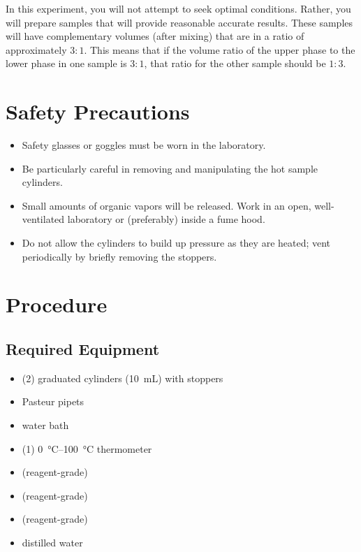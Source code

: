 In this experiment, you will not attempt to seek optimal conditions. 
Rather, you will prepare samples that will provide reasonable accurate results. 
These samples will have complementary volumes (after mixing) that are in a ratio of approximately \(3{:}1\). This means that if the volume ratio of the upper phase to the lower phase in one sample is \(3{:}1\), that ratio for the other sample should be \(1{:}3\).

\section{Safety Precautions}
\label{sec:safety}

\begin{itemize}
	\item Safety glasses or goggles must be worn in the laboratory.
	\item Be particularly careful in removing and manipulating the hot sample cylinders.
	\item Small amounts of organic vapors will be released. 
		Work in an open, well-ventilated laboratory or (preferably) inside a fume hood.
	\item Do not allow the cylinders to build up pressure as they are heated; vent periodically by briefly removing the stoppers.
\end{itemize}

\section{Procedure}
\label{sec:procedure}

\subsection{Required Equipment}
\label{subs:required_equipment}

\begin{itemize}
	\item (2) graduated cylinders (\qty{10}{\mL}) with stoppers
	\item Pasteur pipets
	\item water bath
	\item (1) \qtyrange{0}{100}{\celsius} thermometer
	\item {} (reagent-grade)
	\item {} (reagent-grade)
	\item {} (reagent-grade)
	\item distilled water
\end{itemize}

